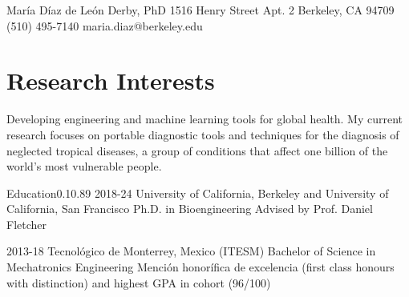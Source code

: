 \documentclass{federico_cv}
\begin{document}
\contact
{María Díaz de León Derby, PhD}
{1516 Henry Street Apt. 2}
{Berkeley, CA 94709}
{(510) 495-7140} %
{maria.diaz@berkeley.edu} %

\section{Research Interests}
Developing engineering and machine learning tools for global health. My current research focuses on portable diagnostic tools and techniques for the diagnosis of neglected tropical diseases, a group of conditions that affect one billion of the world's most vulnerable people. %


\begin{tblSection}{Education}{0.1}{0.89} %
\degree
{2018-24}
{University of California, Berkeley and University of California, San Francisco}
{Ph.D. in Bioengineering}
{Advised by Prof. Daniel Fletcher}

\degree
{2013-18}
{Tecnológico de Monterrey, Mexico (ITESM)}
{Bachelor of Science in Mechatronics Engineering}
{Mención honorífica de excelencia (first class honours with distinction) and highest GPA in cohort (96/100)}



\end{tblSection}
\end{document}

